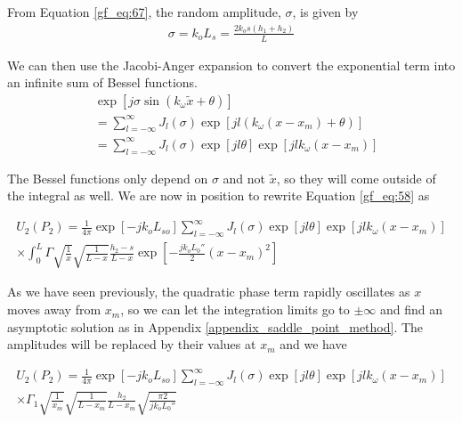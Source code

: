 \noindent From Equation \ref{gf_eq:67}, the random amplitude, $\sigma$, is given by
\begin{equation}
\begin{aligned}
\sigma = k_oL_s = \frac{2k_os(h_1+h_2)}{L}
\end{aligned}
\label{gf_eq:69}
\end{equation}
\renewcommand{\baselinestretch}{2} \small\normalsize

We can then use the Jacobi-Anger expansion \cite{gbur_math} to convert the exponential term into an infinite sum of Bessel functions.
\begin{equation}
\begin{aligned}
& \exp\left[j\sigma \sin\left(k_{\omega} \tilde{x} + \theta\right) \right] \\ &=\sum_{l=-\infty}^{\infty}J_l(\sigma)\exp\left[jl(k_{\omega}(x-x_m) + \theta) \right] \\
&=\sum_{l=-\infty}^{\infty}J_l(\sigma)\exp\left[jl\theta\right]\exp\left[jlk_{\omega}(x-x_m)\right] 
\end{aligned}
\label{gf_eq:70}
\end{equation}
\renewcommand{\baselinestretch}{2} \small\normalsize

The Bessel functions only depend on $\sigma$ and not $\tilde{x}$, so they will come outside of the integral as well. We are now in position to rewrite Equation \ref{gf_eq:58} as

\begin{equation}
\begin{gathered}
U_2(P_2) = \frac{1}{4\pi} \exp[-jk_oL_{so}] \sum_{l=-\infty}^{\infty}J_l(\sigma)\exp\left[jl\theta\right]\exp\left[jlk_{\omega}(x-x_m)\right]  \\
\times \int_0^L  \Gamma \sqrt{\frac{1}{x}}\sqrt{\frac{1}{L-x}}\frac{h_2-s}{L-x}\exp\left[-\frac{jk_oL_0''}{2}(x-x_m)^2 \right]
\label{gf_eq:71}
\end{gathered}
\end{equation}
\renewcommand{\baselinestretch}{2} \small\normalsize

As we have seen previously, the quadratic phase term rapidly oscillates as $x$ moves away from $x_m$, so we can let the integration limits go to $\pm \infty$ and find an asymptotic solution as in Appendix \ref{appendix_saddle_point_method}. The amplitudes will be replaced by their values at $x_m$ and we have

\begin{equation}
\begin{gathered}
U_2(P_2) = \frac{1}{4\pi} \exp[-jk_oL_{so}] \sum_{l=-\infty}^{\infty}J_l(\sigma)\exp\left[jl\theta\right]\exp\left[jlk_{\omega}(x-x_m)\right]  \\
\times \Gamma_1 \sqrt{\frac{1}{x_m}}\sqrt{\frac{1}{L-x_m}}\frac{h_2}{L-x_m}\sqrt{\frac{\pi 2}{jk_oL_0''}}
\label{gf_eq:71}
\end{gathered}
\end{equation}
\renewcommand{\baselinestretch}{2} \small\normalsize

